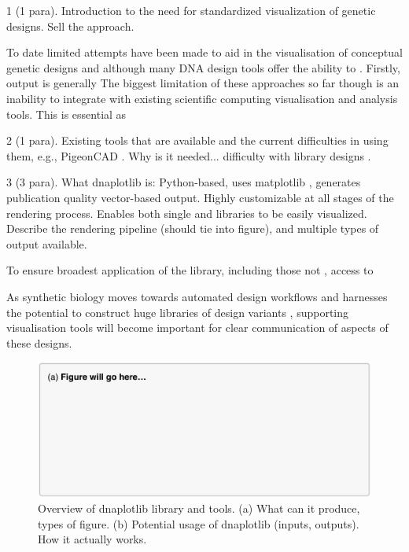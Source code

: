 \documentclass{bioinfo}
\begin{document}
1 (1 para). Introduction to the need for standardized visualization of genetic designs. Sell the approach.

To date limited attempts have been made to aid in the visualisation of conceptual genetic designs \citep{Bhatia13a} and although many DNA design tools offer the ability to . Firstly, output is generally 
The biggest limitation of these approaches so far though is an inability to integrate with existing scientific computing visualisation and analysis tools. This is essential as 



2 (1 para). Existing tools that are available and the current difficulties in using them, e.g., PigeonCAD \citep{Bhatia13a}. Why is it needed... difficulty with library designs \citep{Smanski14a}.

3 (3 para). What dnaplotlib is: Python-based, uses matplotlib \citep{Hunter07a}, generates publication quality vector-based output. Highly customizable at all stages of the rendering process. Enables both single and libraries to be easily visualized. Describe the rendering pipeline (should tie into figure), and multiple types of output available.


To ensure broadest application of the library, including those not , access to 


As synthetic biology moves towards automated design workflows and harnesses the potential to construct huge libraries of design variants \citep{Smanski14a}, supporting visualisation tools will become important for clear communication of aspects of these designs.



\begin{figure}[t]
\centering
\includegraphics[width=\textwidth]{Figure1.pdf}
\caption{\label{fig:overview}Overview of dnaplotlib library and tools. (a) What can it produce, types of figure. (b) Potential usage of dnaplotlib (inputs, outputs). How it actually works.}
\end{figure}
\end{document}
